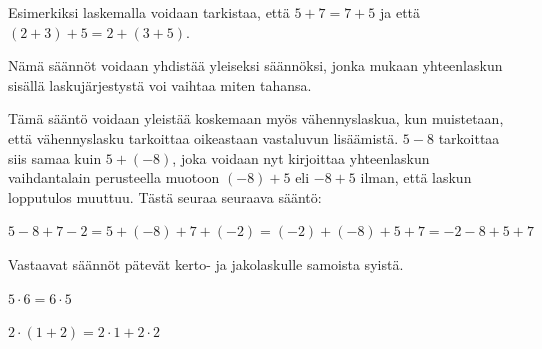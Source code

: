 
Esimerkiksi laskemalla voidaan tarkistaa, että $5+7=7+5$ ja että $(2+3)+5=2+(3+5)$.

Nämä säännöt voidaan yhdistää yleiseksi säännöksi, jonka mukaan yhteenlaskun sisällä laskujärjestystä voi vaihtaa miten tahansa.

Tämä sääntö voidaan yleistää koskemaan myös vähennyslaskua, kun muistetaan, että vähennyslasku tarkoittaa oikeastaan vastaluvun lisäämistä. $5-8$ tarkoittaa siis samaa kuin $5+(-8)$, joka voidaan nyt kirjoittaa yhteenlaskun vaihdantalain perusteella muotoon $(-8)+5$ eli $-8+5$ ilman, että laskun lopputulos muuttuu. Tästä seuraa seuraava sääntö:


\begin{esimerkki} 
$5-8+7-2=5+(-8)+7+(-2)=(-2)+(-8)+5+7=-2-8+5+7$ 
\end{esimerkki}

Vastaavat säännöt pätevät kerto- ja jakolaskulle samoista syistä.




\begin{esimerkki}

$5 \cdot 6 = 6 \cdot 5$
 
 $2 \cdot (1+2) = 2 \cdot 1 + 2 \cdot 2$
\end{esimerkki} 



